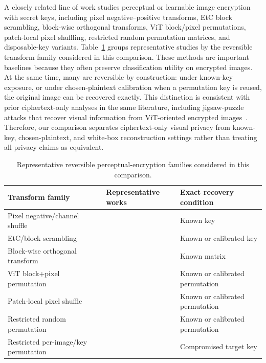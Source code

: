 \documentclass{ieeeaccess}
\newcommand{\rev}[1]{{\color{black}#1}}
\begin{document}
\rev{A closely related line of work studies perceptual or learnable image encryption with secret keys, including pixel negative--positive transforms, EtC block scrambling, block-wise orthogonal transforms, ViT block/pixel permutations, patch-local pixel shuffling, restricted random permutation matrices, and disposable-key variants. Table~\ref{tab:reversible-family-map} groups representative studies by the reversible transform family considered in this comparison. These methods are important baselines because they often preserve classification utility on encrypted images. At the same time, many are reversible by construction: under known-key exposure, or under chosen-plaintext calibration when a permutation key is reused, the original image can be recovered exactly. This distinction is consistent with prior ciphertext-only analyses in the same literature, including jigsaw-puzzle attacks that recover visual information from ViT-oriented encrypted images~\cite{chuman2023_jigsaw}. Therefore, our comparison separates ciphertext-only visual privacy from known-key, chosen-plaintext, and white-box reconstruction settings rather than treating all privacy claims as equivalent.}

\begin{table}[t]
\centering
\caption{\rev{Representative reversible perceptual-encryption families considered in this comparison.}}
\label{tab:reversible-family-map}
\small
\setlength{\tabcolsep}{4pt}
\begin{tabular}{@{}p{} p{} p{}@{}}
\toprule
\rev{\textbf{Transform family}} & \rev{\textbf{Representative works}} & \rev{\textbf{Exact recovery condition}} \\
\midrule
\rev{Pixel negative/channel shuffle} & \rev{\cite{sirichotedumrong2019pixel}} & \rev{Known key} \\
\rev{EtC/block scrambling} & \rev{\cite{kawamura2020etc,maungmaung2022isotropic,qi2022convmixer_adaptive_permutation,hamano2023jpeg_etc_vit,lin2024convmixer}} & \rev{Known or calibrated key} \\
\rev{Block-wise orthogonal transform} & \rev{\cite{aso2023random_orthogonal_convmixer}} & \rev{Known matrix} \\
\rev{ViT block+pixel permutation} & \rev{\cite{qi2022vit,nagamori2023federated_vit,nagamori2024domain_adaptation,kiya2023reliable_vit}} & \rev{Known or calibrated permutation} \\
\rev{Patch-local pixel shuffle} & \rev{\cite{iijima2022convmixer_model_encryption,kiya2023image_model,jimaging8090233}} & \rev{Known or calibrated permutation} \\
\rev{Restricted random permutation} & \rev{\cite{horio2024privacypreservingvisiontransformerusing}} & \rev{Known or calibrated permutation} \\
\rev{Restricted per-image/key permutation} & \rev{\cite{aso2024disposable,hirose2025no_key_management}} & \rev{Compromised target key} \\
\bottomrule
\end{tabular}
\end{table}
\end{document}
